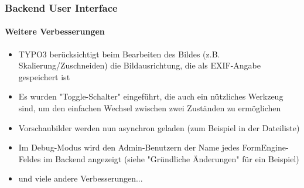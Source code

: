 \begin{frame}[fragile]
	\frametitle{Backend User Interface}
	\framesubtitle{Weitere Verbesserungen}

	\begin{itemize}
		\item TYPO3 berücksichtigt beim Bearbeiten des Bildes (z.B. Skalierung/Zuschneiden)
			die Bildausrichtung, die als EXIF-Angabe gespeichert ist
		\item Es wurden "Toggle-Schalter" eingeführt, die auch ein nützliches Werkzeug sind,
			um den einfachen Wechsel zwischen zwei Zuständen zu ermöglichen
		\item Vorschaubilder werden nun asynchron geladen\newline
			\small(zum Beispiel in der Dateiliste)\normalsize
		\item Im Debug-Modus wird den Admin-Benutzern der Name jedes FormEngine-Feldes im 
			Backend angezeigt\newline
			\small(siehe "Gründliche Änderungen" für ein Beispiel)\normalsize
		\item und viele andere Verbesserungen...
	\end{itemize}

\end{frame}

